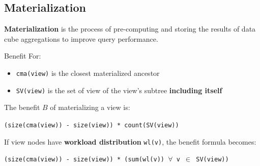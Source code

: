 \subsection{Materialization}

\textbf{Materialization} is the process of pre-computing and storing the results of data cube aggregations to improve query performance.

\begin{definition}
    {Benefit}
    For:
    \begin{itemize}
        \item \texttt{cma(view)} is the closest materialized ancestor
        \item \texttt{SV(view)} is the set of view of the view's subtree \textbf{including itself}
    \end{itemize}

    The benefit $B$ of materializing a view is:

    \begin{center}
        \texttt{(size(cma(view)) - size(view)) * count(SV(view))}
    \end{center}

    If view nodes have \textbf{workload distribution} \texttt{wl(v)}, the benefit formula becomes:

    \begin{center}
        \texttt{(size(cma(view)) - size(view)) * (sum(wl(v)) $\forall$ v $\in$ SV(view))}
    \end{center}
\end{definition}

